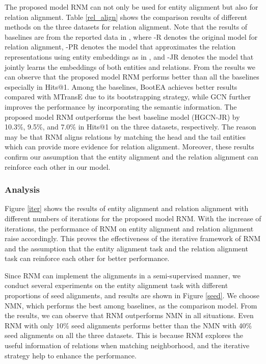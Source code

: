 \documentclass[letterpaper]{article} %
\begin{document}
The proposed model RNM can not only be used for entity alignment but
also for relation alignment. Table \ref{rel_align} shows the
comparison results of different methods on the three datasets for
relation alignment. Note that the results of baselines are from the
reported data in \cite{wu2019jointly}, where -R denotes the original
model for relation alignment, -PR denotes the model that
approximates the relation representations using entity embeddings as
in \cite{wu2019jointly}, and -JR denotes the model that jointly
learns the embeddings of both entities and relations. From the
results we can observe that the proposed model RNM performs better
than all the baselines especially in Hits@1. Among the baselines,
BootEA achieves better results compared with MTransE due to its
bootstrapping strategy, while GCN further improves the performance
by incorporating the semantic information. The proposed model RNM
outperforms the best baseline model (HGCN-JR) by 10.3\%, 9.5\%, and
7.0\% in Hits@1 on the three datasets, respectively. The reason may
be that RNM aligns relations by matching the head and the tail
entities which can provide more evidence for relation alignment.
Moreover, these results confirm our assumption that the entity
alignment and the relation alignment can reinforce each other in our
model.


\subsubsection{Analysis}

Figure \ref{iter} shows the results of entity alignment and relation
alignment with different numbers of iterations for the proposed
model RNM. With the increase of iterations, the performance of RNM
on entity alignment and relation alignment raise accordingly. This
proves the effectiveness of the iterative framework of RNM and the
assumption that the entity alignment task and the relation alignment
task can reinforce each other for better performance.


Since RNM can implement the alignments in a semi-supervised manner,
we conduct several experiments on the entity alignment task with
different proportions of seed alignments, and results are shown in
Figure \ref{seed}. We choose NMN, which performs the best among baselines,  
as the comparison model. From the
results, we can observe that RNM outperforms NMN in all situations.
Even RNM with only 10\% seed alignments performs better than the NMN
with 40\% seed alignments on all the three datasets. This is because
RNM explores the useful information of relations when matching
neighborhood, and the iterative
strategy help to enhance the performance.
\end{document}
